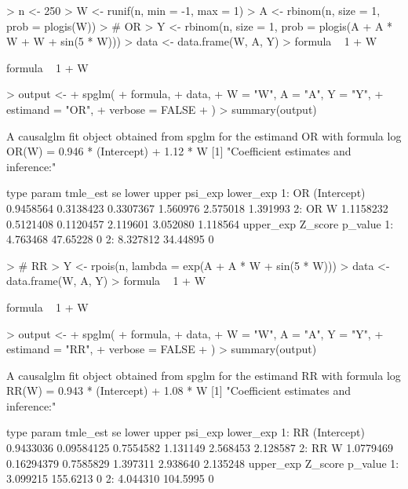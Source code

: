 \documentclass{article}
\begin{document}
\begin{Schunk}
\begin{Sinput}
> n <- 250
> W <- runif(n, min = -1, max = 1)
> A <- rbinom(n, size = 1, prob = plogis(W))
> # OR
> Y <- rbinom(n, size = 1, prob = plogis(A + A * W + W + sin(5 * W)))
> data <- data.frame(W, A, Y)
> formula ~ 1 + W
\end{Sinput}
\begin{Soutput}
formula ~ 1 + W
\end{Soutput}
\begin{Sinput}
> output <-
+   spglm(
+     formula,
+     data,
+     W = "W", A = "A", Y = "Y",
+     estimand = "OR",
+     verbose = FALSE
+   )
> summary(output)
\end{Sinput}
\begin{Soutput}
A causalglm fit object obtained from spglm for the estimand OR with formula 
log OR(W) = 0.946 * (Intercept) + 1.12 * W
[1] "Coefficient estimates and inference:"

   type       param  tmle_est        se     lower    upper  psi_exp lower_exp
1:   OR (Intercept) 0.9458564 0.3138423 0.3307367 1.560976 2.575018  1.391993
2:   OR           W 1.1158232 0.5121408 0.1120457 2.119601 3.052080  1.118564
   upper_exp  Z_score p_value
1:  4.763468 47.65228       0
2:  8.327812 34.44895       0
\end{Soutput}
\begin{Sinput}
> # RR
> Y <- rpois(n, lambda = exp(A + A * W + sin(5 * W)))
> data <- data.frame(W, A, Y)
> formula ~ 1 + W
\end{Sinput}
\begin{Soutput}
formula ~ 1 + W
\end{Soutput}
\begin{Sinput}
> output <-
+   spglm(
+     formula,
+     data,
+     W = "W", A = "A", Y = "Y",
+     estimand = "RR",
+     verbose = FALSE
+   )
> summary(output)
\end{Sinput}
\begin{Soutput}
A causalglm fit object obtained from spglm for the estimand RR with formula 
log RR(W) = 0.943 * (Intercept) + 1.08 * W
[1] "Coefficient estimates and inference:"

   type       param  tmle_est         se     lower    upper  psi_exp lower_exp
1:   RR (Intercept) 0.9433036 0.09584125 0.7554582 1.131149 2.568453  2.128587
2:   RR           W 1.0779469 0.16294379 0.7585829 1.397311 2.938640  2.135248
   upper_exp  Z_score p_value
1:  3.099215 155.6213       0
2:  4.044310 104.5995       0
\end{Soutput}
\end{Schunk}
\end{document}
